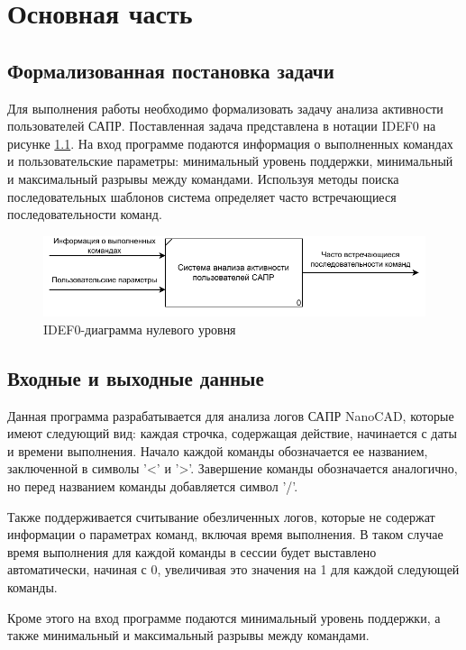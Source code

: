 \chapter{Основная часть}
\label{cha:design}

\section{Формализованная постановка задачи}
Для выполнения работы необходимо формализовать задачу анализа активности пользователей САПР. Поставленная задача представлена в нотации IDEF0 на рисунке \ref{idef0}. На вход программе подаются информация о выполненных командах и пользовательские параметры: минимальный уровень поддержки, минимальный и максимальный разрывы между командами. Используя методы поиска последовательных шаблонов система определяет часто встречающиеся последовательности команд.

\begin{figure}[h!]
	\centering
	\includegraphics[width=1.0\textwidth]{inc/img/IDEF0.drawio.pdf}
	\caption{IDEF0-диаграмма нулевого уровня}
	\label{idef0}
\end{figure}

\section{Входные и выходные данные}
Данная программа разрабатывается для анализа логов САПР NanoCAD, которые имеют следующий вид: каждая строчка, содержащая действие, начинается с даты и времени выполнения. Начало каждой команды обозначается ее названием, заключенной в символы '<' и '>'. Завершение команды обозначается аналогично, но перед названием команды добавляется символ '/'.

Также поддерживается считывание обезличенных логов, которые не содержат информации о параметрах команд, включая время выполнения. В таком случае время выполнения для каждой команды в сессии будет выставлено автоматически, начиная с 0, увеличивая это значения на 1 для каждой следующей команды.

Кроме этого на вход программе подаются минимальный уровень поддержки, а также минимальный и максимальный разрывы между командами.

